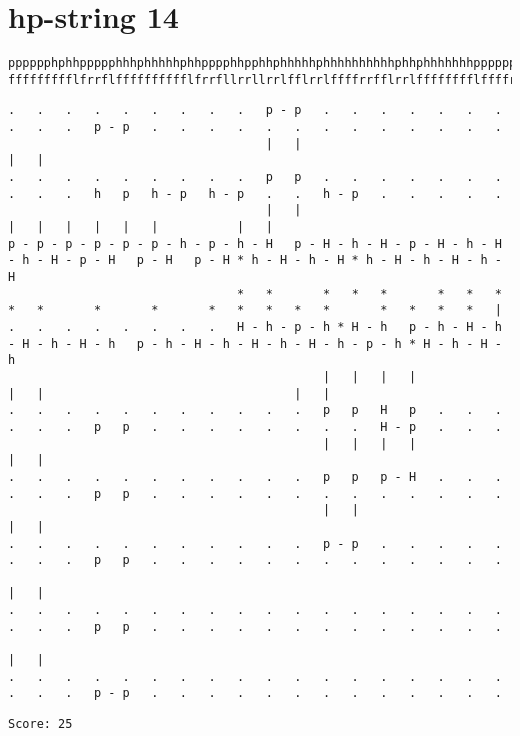 \documentclass[a4paper,oneside,article,11pt]{memoir}
\begin{document}
\section*{hp-string 14}
\begin{lstlisting}[basicstyle=\fontsize{6}{11}\ttfamily]
pppppphphhppppphhhphhhhhphhpppphhpphhphhhhhphhhhhhhhhhphhphhhhhhhppppppppppphhhhhhhpphphhhpppppphphh
ffffffffflfrrflfffffffffflfrrfllrrllrrlfflrrlffffrrfflrrlfffffffflffffrrfffflfffffflfrrfllffrrfflff
\end{lstlisting}
\begin{lstlisting}[basicstyle=\fontsize{4}{11}\ttfamily]
.   .   .   .   .   .   .   .   .   p - p   .   .   .   .   .   .   .   .   .   .   p - p   .   .   .   .   .   .   .   .   .   .   .   .   .
                                    |   |                                           |   |
.   .   .   .   .   .   .   .   .   p   p   .   .   .   .   .   .   .   .   .   .   h   p   h - p   h - p   .   .   h - p   .   .   .   .   .
                                    |   |                                           |   |   |   |   |   |           |   |
p - p - p - p - p - p - h - p - h - H   p - H - h - H - p - H - h - H - h - H - p - H   p - H   p - H * h - H - h - H * h - H - h - H - h - H
                                *   *       *   *   *       *   *   *   *   *       *       *       *   *   *   *   *       *   *   *   *   |
.   .   .   .   .   .   .   .   H - h - p - h * H - h   p - h - H - h - H - h - H - h   p - h - H - h - H - h - H - h - p - h * H - h - H - h
                                            |   |   |   |                           |   |                                   |   |
.   .   .   .   .   .   .   .   .   .   .   p   p   H   p   .   .   .   .   .   .   p   p   .   .   .   .   .   .   .   .   H - p   .   .   .
                                            |   |   |   |                           |   |
.   .   .   .   .   .   .   .   .   .   .   p   p   p - H   .   .   .   .   .   .   p   p   .   .   .   .   .   .   .   .   .   .   .   .   .
                                            |   |                                   |   |
.   .   .   .   .   .   .   .   .   .   .   p - p   .   .   .   .   .   .   .   .   p   p   .   .   .   .   .   .   .   .   .   .   .   .   .
                                                                                    |   |
.   .   .   .   .   .   .   .   .   .   .   .   .   .   .   .   .   .   .   .   .   p   p   .   .   .   .   .   .   .   .   .   .   .   .   .
                                                                                    |   |
.   .   .   .   .   .   .   .   .   .   .   .   .   .   .   .   .   .   .   .   .   p - p   .   .   .   .   .   .   .   .   .   .   .   .   .

\end{lstlisting}
\begin{lstlisting}
Score: 25
\end{lstlisting}
\end{document}
